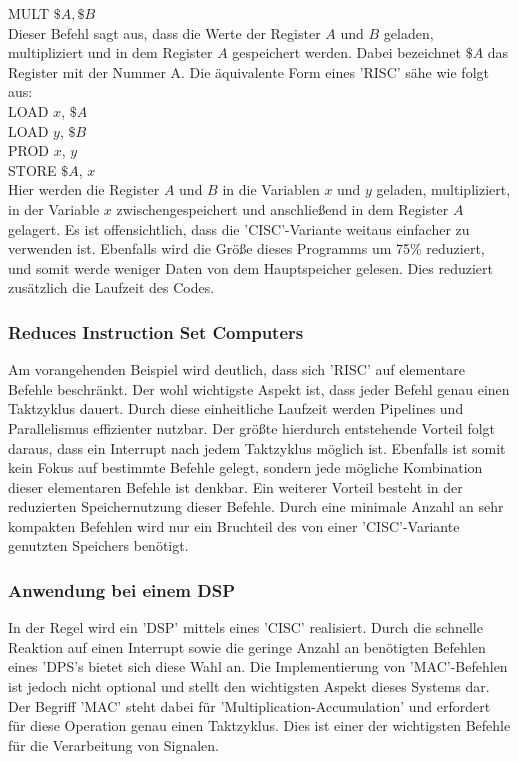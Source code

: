 MULT $\$A, \$B$\\
\newline
Dieser Befehl sagt aus, dass die Werte der Register $A$ und $B$ geladen, multipliziert und in dem Register $A$ gespeichert werden. Dabei bezeichnet $\$A$ das Register mit der Nummer A. Die äquivalente Form eines 'RISC' sähe wie folgt aus:\\

LOAD $x$, $\$A$\\ 
LOAD $y$, $\$B$\\
PROD $x$, $y$\\
STORE $\$A$, $x$\\
\newline
Hier werden die Register $A$ und $B$ in die Variablen $x$ und $y$ geladen, multipliziert, in der Variable $x$ zwischengespeichert und anschließend in dem Register $A$ gelagert. Es ist offensichtlich, dass die 'CISC'-Variante weitaus einfacher zu verwenden ist. Ebenfalls wird die Größe dieses Programms um 75\% reduziert, und somit werde weniger Daten von dem Hauptspeicher gelesen. Dies reduziert zusätzlich die Laufzeit des Codes.

\subsubsection{Reduces Instruction Set Computers}
Am vorangehenden Beispiel wird deutlich, dass sich 'RISC' auf elementare Befehle beschränkt. Der wohl wichtigste Aspekt ist, dass jeder Befehl genau einen Taktzyklus dauert. Durch diese einheitliche Laufzeit werden Pipelines und Parallelismus effizienter nutzbar. Der größte hierdurch entstehende Vorteil folgt daraus, dass ein Interrupt nach jedem Taktzyklus möglich ist. Ebenfalls ist somit kein Fokus auf bestimmte Befehle gelegt, sondern jede mögliche Kombination dieser elementaren Befehle ist denkbar. Ein weiterer Vorteil besteht in der reduzierten Speichernutzung dieser Befehle. Durch eine minimale Anzahl an sehr kompakten Befehlen wird nur ein Bruchteil des von einer 'CISC'-Variante genutzten Speichers benötigt.

\subsubsection{Anwendung bei einem DSP}
In der Regel wird ein 'DSP' mittels eines 'CISC' realisiert. Durch die schnelle Reaktion auf einen Interrupt sowie die geringe Anzahl an benötigten Befehlen eines 'DPS's bietet sich diese Wahl an. Die Implementierung von 'MAC'-Befehlen ist jedoch nicht optional und stellt den wichtigsten Aspekt dieses Systems dar. Der Begriff 'MAC' steht dabei für 'Multiplication-Accumulation' und erfordert für diese Operation genau einen Taktzyklus. Dies ist einer der wichtigsten Befehle für die Verarbeitung von Signalen.

